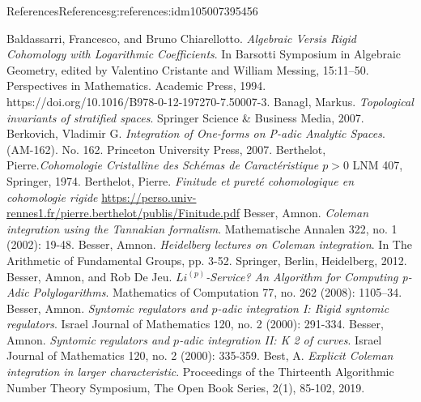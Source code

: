 \documentclass[oneside,10pt,]{book}
\numberwithin{equation}{section}
\newcommand{\gt}{>}
\begin{document}
\begin{references-chapter-numberless}{References}{}{References}{}{}{g:references:idm105007395456}
\begin{thebibliography}{9}
\hypertarget{x:biblio:bib-baldassarri-chiarallotto}{}Baldassarri, Francesco, and Bruno Chiarellotto. \textit{Algebraic Versis Rigid Cohomology with Logarithmic Coefficients}. In Barsotti Symposium in Algebraic Geometry, edited by Valentino Cristante and William Messing, 15:11–50. Perspectives in Mathematics. Academic Press, 1994. https:\slash{}\slash{}doi.org\slash{}10.1016\slash{}B978-0-12-197270-7.50007-3.
\hypertarget{x:biblio:bib-banagl}{}Banagl, Markus. \textit{Topological invariants of stratified spaces}. Springer Science \& Business Media, 2007.
\hypertarget{x:biblio:bib-berkovich}{}Berkovich, Vladimir G.  \textit{Integration of One-forms on P-adic Analytic Spaces}. (AM-162). No. 162. Princeton University Press, 2007.
\hypertarget{x:biblio:bib-berth1}{}Berthelot, Pierre.\textit{Cohomologie Cristalline des Schémas de Caractéristique \(p\gt 0\)} LNM 407, Springer, 1974.
\hypertarget{x:biblio:bib-berth2}{}Berthelot, Pierre.  \textit{Finitude et pureté cohomologique en cohomologie rigide} \url{https://perso.univ-rennes1.fr/pierre.berthelot/publis/Finitude.pdf}
\hypertarget{x:biblio:bib-besser-coleman-tannakian}{}Besser, Amnon. \textit{Coleman integration using the Tannakian formalism}. Mathematische Annalen 322, no. 1 (2002): 19-48.
\hypertarget{x:biblio:bib-besser-coleman-heidelberg}{}Besser, Amnon. \textit{Heidelberg lectures on Coleman integration}. In The Arithmetic of Fundamental Groups, pp. 3-52. Springer, Berlin, Heidelberg, 2012.
\hypertarget{x:biblio:bib-besser-de-jeu}{}Besser, Amnon, and Rob De Jeu. \textit{\(Li^{(p)}\)-Service? An Algorithm for Computing p-Adic Polylogarithms}. Mathematics of Computation 77, no. 262 (2008): 1105–34.
\hypertarget{x:biblio:bib-besser-syntomic-I}{}Besser, Amnon. \textit{Syntomic regulators and \(p\)-adic integration I: Rigid syntomic regulators}. Israel Journal of Mathematics 120, no. 2 (2000): 291-334.
\hypertarget{x:biblio:bib-besser-syntomic-II}{}Besser, Amnon. \textit{Syntomic regulators and \(p\)-adic integration II: K 2 of curves}. Israel Journal of Mathematics 120, no. 2 (2000): 335-359.
\hypertarget{x:biblio:bib-best-coleman-harvey}{}Best, A. \textit{Explicit Coleman integration in larger characteristic}. Proceedings of the Thirteenth Algorithmic Number Theory Symposium, The Open Book Series, 2(1), 85-102, 2019.

\end{thebibliography}
\end{references-chapter-numberless}
\end{document}
